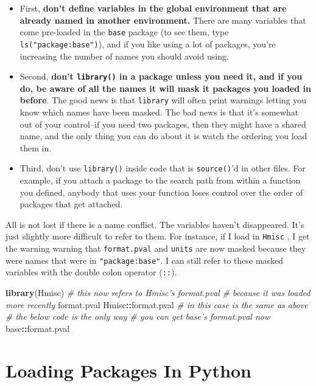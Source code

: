 \documentclass[12pt,krantz2]{krantz}
\makeatletter
\newenvironment{Shaded}{\begin{snugshade}}{\end{snugshade}}
\newcommand{\CommentTok}[1]{\textcolor[rgb]{0.37,0.37,0.37}{\textit{#1}}}
\newcommand{\KeywordTok}[1]{\textcolor[rgb]{0.27,0.27,0.27}{\textbf{#1}}}
\newcommand{\NormalTok}[1]{#1}
\newcommand{\OperatorTok}[1]{\textcolor[rgb]{0.43,0.43,0.43}{\textbf{#1}}}
\newenvironment{kframe}{%
\medskip{}
\setlength{\fboxsep}{.8em}
 \def\at@end@of@kframe{}%
 \ifinner\ifhmode%
  \def\at@end@of@kframe{\end{minipage}}%
  \begin{minipage}{\columnwidth}%
 \fi\fi%
 \def\FrameCommand##1{\hskip\@totalleftmargin \hskip-\fboxsep
 \colorbox{shadecolor}{##1}\hskip-\fboxsep
     \hskip-\linewidth \hskip-\@totalleftmargin \hskip\columnwidth}%
 \MakeFramed {\advance\hsize-\width
   \@totalleftmargin\z@ \linewidth\hsize
   \@setminipage}}%
 {\par\unskip\endMakeFramed%
 \at@end@of@kframe}
\renewenvironment{Shaded}{\begin{kframe}}{\end{kframe}}
\makeatother
\begin{document}
\begin{itemize}
\item
  First, \textbf{don't define variables in the global environment that are already named in another environment.} There are many variables that come pre-loaded in the \texttt{base} package (to see them, type \texttt{ls("package:base")}), and if you like using a lot of packages, you're increasing the number of names you should avoid using.
\item
  Second, \textbf{don't \texttt{library()} in a package unless you need it, and if you do, be aware of all the names it will mask it packages you loaded in before}. The good news is that \texttt{library} will often print warnings letting you know which names have been masked. The bad news is that it's somewhat out of your control--if you need two packages, then they might have a shared name, and the only thing you can do about it is watch the ordering you load them in.
\item
  Third, don't use \texttt{library()} inside code that is \texttt{source()}'d in other files. For example, if you attach a package to the search path from within a function you defined, anybody that uses your function loses control over the order of packages that get attached.
\end{itemize}

All is not lost if there is a name conflict. The variables haven't disappeared. It's just slightly more difficult to refer to them. For instance, if I load in \texttt{Hmisc} \citep{hmisc}, I get the warning warning that \texttt{format.pval} and \texttt{units} are now masked because they were names that were in \texttt{"package:base"}. I can still refer to these masked variables with the double colon operator (\texttt{::}).

\begin{Shaded}
\begin{Highlighting}[]
\KeywordTok{library}\NormalTok{(Hmisc)}
\CommentTok{# this now refers to Hmisc's format.pval }
\CommentTok{# because it was loaded more recently}
\NormalTok{format.pval }
\NormalTok{Hmisc}\OperatorTok{::}\NormalTok{format.pval }\CommentTok{# in this case is the same as above}
\CommentTok{# the below code is the only way }
\CommentTok{# you can get base's format.pval now}
\NormalTok{base}\OperatorTok{::}\NormalTok{format.pval  }
\end{Highlighting}
\end{Shaded}

\hypertarget{loading-packages-in-python}{%
\section{Loading Packages In Python}\label{loading-packages-in-python}}
\end{document}
